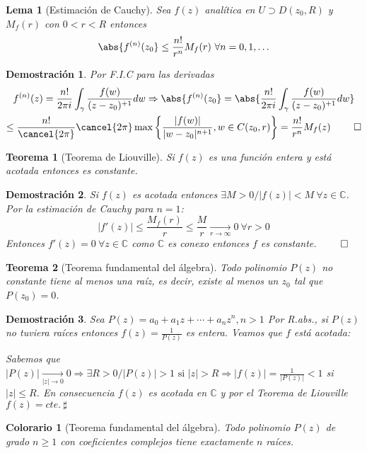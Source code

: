 \documentclass[10pt]{book}
\newtheorem{theorem}{Teorema}[chapter]
\newtheorem*{dem}{Demostración}
\newtheorem{col}{Colorario}[chapter]
\newtheorem{lema}{Lema}[chapter]
\newcommand{\C}{\mathbb{C}}
\begin{document}
\begin{lema}[Estimación de Cauchy]
Sea $f(z)$ analítica en $U \supset D(z_0,R)$ y $M_f(r)$ con $0<r<R$ entonces
$$\abs{ f^{(n)}(z_0} \leq \frac{n!}{r^n}M_f(r)\ \forall n = 0,1,\ldots$$
\end{lema}

\begin{dem}
Por F.I.C para las derivadas
\begin{multline*}
f^{(n)}(z) = \frac{n!}{2\pi i}\int_\gamma \frac{f(w)}{(z-z_0)^{+1}}dw \Rightarrow \abs{ f^{(n)}(z_0} = \abs{ \frac{n!}{2\pi i}\int_\gamma \frac{f(w)}{(z-z_0)^{+1}}dw }\\
 \leq \frac{n!}{\cancel{2\pi}}\cancel{2\pi} \max\left\lbrace\frac{|f(w)|}{|w-z_0|^{n+1}}, w\in C(z_0,r)\right\rbrace = \frac{n!}{r^n}M_f(z) \ \qed
\end{multline*}
\end{dem}


\begin{theorem}[Teorema de Liouville]
Si $f(z)$ es una función entera y está acotada entonces es constante.
\end{theorem}

\begin{dem}
Si $f(z)$ es acotada entonces $\exists M>0 / |f(z)|<M \ \forall z\in \C$. Por la estimación de Cauchy para $n=1$:
$$|f'(z)| \leq \frac{M_f(r)}{r}\leq \frac{M}{r} \xrightarrow[r\to \infty]{} 0 \ \forall r>0$$ Entonces $f'(z)=0 \ \forall z\in\C$ como $\C$ es conexo entonces $f$ es constante. $\qed$
\end{dem}


\begin{theorem}[Teorema fundamental del álgebra]
Todo polinomio $P(z)$ no constante tiene al menos una raíz, es decir, existe al menos un $z_0$ tal que $P(z_0)=0$.
\end{theorem}


\begin{dem}
Sea $P(z) = a_0 + a_1z + \cdots + a_n z^n, n>1$ Por R.abs., si $P(z)$ no tuviera raíces entonces $f(z) = \frac{1}{P(z)}$ es entera. Veamos que $f$ está acotada:

Sabemos que $\displaystyle |P(z)|\xrightarrow[|z|\to 0]{} 0 \Rightarrow \exists R>0 / |P(z)|>1 \text{ si } |z| >R \Rightarrow |f(z)| = \frac{1}{|P(z)|} <1$ si $|z|\leq R$. En consecuencia $f(z)$ es acotada en $\C$ y por el Teorema de Liouville $f(z) = cte.\ \sharp$
\end{dem}

\begin{col}[Teorema fundamental del álgebra]
Todo polinomio $P(z)$ de grado $n\geq 1$ con coeficientes complejos tiene exactamente $n$ raíces.
\end{col}
\end{document}
